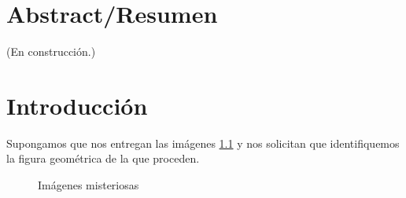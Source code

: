 \documentclass[12pt, a4paper, twoside]{book}
\numberwithin{equation}{section}
\theoremstyle{definition}
\theoremstyle{remark}
\theoremstyle{plain}
\begin{document}
	
	
	\pagestyle{main}

	
	
	\chapter*{Abstract/Resumen}
	(En construcción.)

	
	\tableofcontents

	
	\chapter{Introducción}
	Supongamos que nos entregan las imágenes \ref{fig:mist} y nos 
	solicitan que identifiquemos la figura geométrica de la que proceden.

	\begin{figure}[!htbp]
			\begin{figure}[H]
			\end{figure}
		\endminipage
			\begin{figure}[H]
			\end{figure}
		\endminipage
		\caption{Imágenes misteriosas}
		\label{fig:mist}
	\end{figure}
\end{document}
